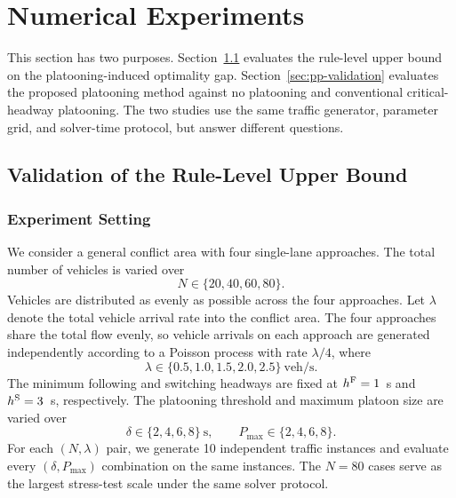 \section{Numerical Experiments}
\label{sec:experiments}

This section has two purposes. Section~\ref{sec:bound-validation} evaluates the rule-level upper bound on the platooning-induced optimality gap. Section~\ref{sec:pp-validation} evaluates the proposed platooning method against no platooning and conventional critical-headway platooning. The two studies use the same traffic generator, parameter grid, and solver-time protocol, but answer different questions.

\subsection{Validation of the Rule-Level Upper Bound}
\label{sec:bound-validation}

\subsubsection{Experiment Setting}
\label{sec:bound-setting}

We consider a general conflict area with four single-lane approaches. The total number of vehicles is varied over
\begin{equation}
N\in\{20,40,60,80\}.
\end{equation}
Vehicles are distributed as evenly as possible across the four approaches. Let \(\lambda\) denote the total vehicle arrival rate into the conflict area. The four approaches share the total flow evenly, so vehicle arrivals on each approach are generated independently according to a Poisson process with rate \(\lambda/4\), where
\begin{equation}
\lambda\in\{0.5,1.0,1.5,2.0,2.5\}\ \text{veh/s}.
\end{equation}
The minimum following and switching headways are fixed at \(h^{\mathrm{F}}=1\)~s and \(h^{\mathrm{S}}=3\)~s, respectively. The platooning threshold and maximum platoon size are varied over
\begin{equation}
\delta\in\{2,4,6,8\}\ \text{s},
\qquad
P_{\max}\in\{2,4,6,8\}.
\end{equation}
For each \((N,\lambda)\) pair, we generate 10 independent traffic instances and evaluate every \((\delta,P_{\max})\) combination on the same instances.
The \(N=80\) cases serve as the largest stress-test scale under the same solver protocol.

